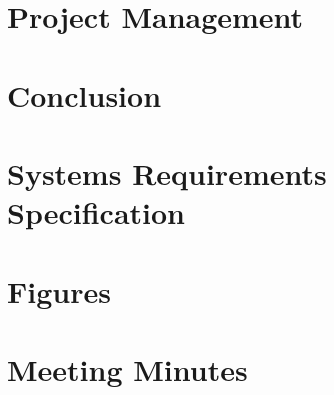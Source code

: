 \documentclass[12pt]{report}
\newcommand\blankpage{%
    \null
    \thispagestyle{empty}%
    \addtocounter{page}{-1}%
    \newpage}
\begin{document}
\chapter{Project Management}


\chapter{Conclusion}


\afterpage{\blankpage}

\begin{appendices}

\chapter{Systems Requirements Specification}


\chapter{Figures}


\afterpage{\blankpage}
\chapter{Meeting Minutes}


\end{appendices}

% 
% 
\printbibliography
\end{document}
